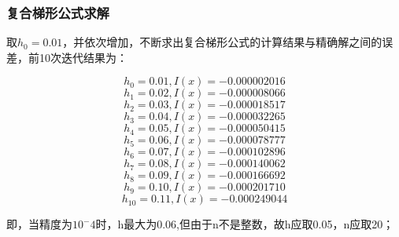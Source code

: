 \subsubsection{复合梯形公式求解}
取$h_0=0.01$，并依次增加，不断求出复合梯形公式的计算结果与精确解之间的误差，前10次迭代结果为：

$$h_{0}=0.01,I(x)=-0.000002016$$
$$h_{1}=0.02,I(x)=-0.000008066$$
$$h_{2}=0.03,I(x)=-0.000018517$$
$$h_{3}=0.04,I(x)=-0.000032265$$
$$h_{4}=0.05,I(x)=-0.000050415$$
$$h_{5}=0.06,I(x)=-0.000078777$$
$$h_{6}=0.07,I(x)=-0.000102896$$
$$h_{7}=0.08,I(x)=-0.000140062$$
$$h_{8}=0.09,I(x)=-0.000166692$$
$$h_{9}=0.10,I(x)=-0.000201710$$
$$h_{10}=0.11,I(x)=-0.000249044$$


即，当精度为$10^-4$时，h最大为0.06,但由于n不是整数，故h应取0.05，n应取20；










